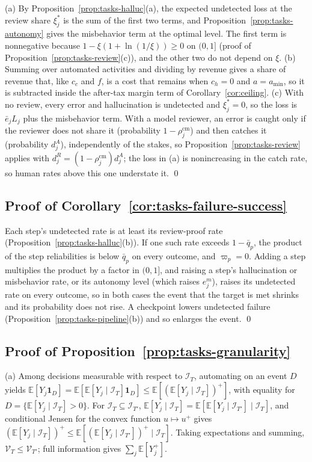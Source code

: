 (a) By Proposition~\ref{prop:tasks-halluc}(a), the expected undetected loss at the review share $\xi^*_j$ is the sum of the first two terms, and Proposition~\ref{prop:tasks-autonomy} gives the misbehavior term at the optimal level. The first term is nonnegative because $1-\xi(1+\ln(1/\xi))\ge 0$ on $(0,1]$ (proof of Proposition~\ref{prop:tasks-review}(c)), and the other two do not depend on $\xi$. (b) Summing over automated activities and dividing by revenue gives a share of revenue that, like $c_c$ and $f$, is a cost that remains when $c_h=0$ and $a=a_{\min}$, so it is subtracted inside the after-tax margin term of Corollary~\ref{cor:ceiling}. (c) With no review, every error and hallucination is undetected and $\xi^*_j=0$, so the loss is $\bar e_jL_j$ plus the misbehavior term. With a model reviewer, an error is caught only if the reviewer does not share it (probability $1-\rho^{\mathrm{cm}}_j$) and then catches it (probability $d^A_j$), independently of the stakes, so Proposition~\ref{prop:tasks-review} applies with $d^R_j=(1-\rho^{\mathrm{cm}}_j)d^A_j$; the loss in (a) is nonincreasing in the catch rate, so human rates above this one understate it. \qed

\subsection*{Proof of Corollary~\ref{cor:tasks-failure-success}}

Each step's undetected rate is at least its review-proof rate (Proposition~\ref{prop:tasks-halluc}(b)). If one such rate exceeds $1-\bar q_p$, the product of the step reliabilities is below $\bar q_p$ on every outcome, and $\varpi_p=0$. Adding a step multiplies the product by a factor in $(0,1]$, and raising a step's hallucination or misbehavior rate, or its autonomy level (which raises $e^m_j$), raises its undetected rate on every outcome, so in both cases the event that the target is met shrinks and its probability does not rise. A checkpoint lowers undetected failure (Proposition~\ref{prop:tasks-pipeline}(b)) and so enlarges the event. \qed

\subsection*{Proof of Proposition~\ref{prop:tasks-granularity}}

(a) Among decisions measurable with respect to $\mathcal I_T$, automating on an event $D$ yields $\mathbb E[Y_j\mathbf 1_D]=\mathbb E[\mathbb E[Y_j\mid\mathcal I_T]\mathbf 1_D]\le\mathbb E[(\mathbb E[Y_j\mid\mathcal I_T])^+]$, with equality for $D=\{\mathbb E[Y_j\mid\mathcal I_T]>0\}$. For $\mathcal I_T\subseteq\mathcal I_{T'}$, $\mathbb E[Y_j\mid\mathcal I_T]=\mathbb E[\mathbb E[Y_j\mid\mathcal I_{T'}]\mid\mathcal I_T]$, and conditional Jensen for the convex function $u\mapsto u^+$ gives $(\mathbb E[Y_j\mid\mathcal I_T])^+\le\mathbb E[(\mathbb E[Y_j\mid\mathcal I_{T'}])^+\mid\mathcal I_T]$. Taking expectations and summing, $\mathcal V_T\le\mathcal V_{T'}$; full information gives $\sum_j\mathbb E[Y_j^+]$.

